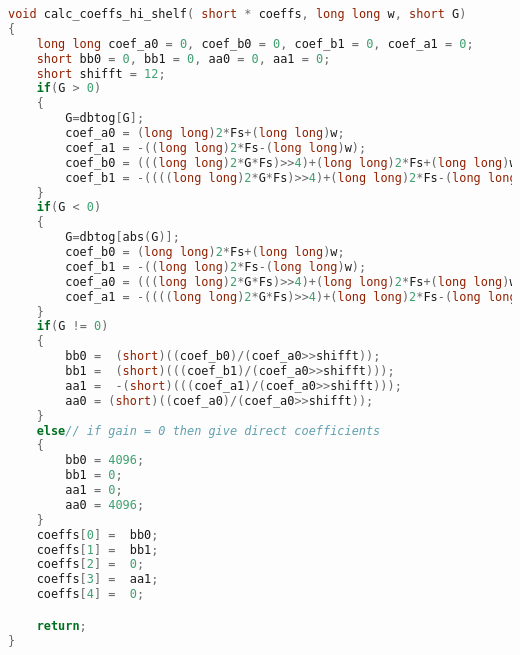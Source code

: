 \begin{lstlisting}[caption={Calculate high frequency shelving filter coefficients.},language=C,label={apcode:calc_hi_filt},tabsize=2]
void calc_coeffs_hi_shelf( short * coeffs, long long w, short G)
{
    long long coef_a0 = 0, coef_b0 = 0, coef_b1 = 0, coef_a1 = 0;
    short bb0 = 0, bb1 = 0, aa0 = 0, aa1 = 0;
    short shifft = 12;
    if(G > 0)
    {
        G=dbtog[G];
        coef_a0 = (long long)2*Fs+(long long)w;
        coef_a1 = -((long long)2*Fs-(long long)w);
        coef_b0 = (((long long)2*G*Fs)>>4)+(long long)2*Fs+(long long)w;
        coef_b1 = -((((long long)2*G*Fs)>>4)+(long long)2*Fs-(long long)w);
    }
    if(G < 0)
    {
        G=dbtog[abs(G)];
        coef_b0 = (long long)2*Fs+(long long)w;
        coef_b1 = -((long long)2*Fs-(long long)w);
        coef_a0 = (((long long)2*G*Fs)>>4)+(long long)2*Fs+(long long)w;
        coef_a1 = -((((long long)2*G*Fs)>>4)+(long long)2*Fs-(long long)w);
    }
    if(G != 0)
    {
        bb0 =  (short)((coef_b0)/(coef_a0>>shifft));
        bb1 =  (short)(((coef_b1)/(coef_a0>>shifft)));
        aa1 =  -(short)(((coef_a1)/(coef_a0>>shifft)));
        aa0 = (short)((coef_a0)/(coef_a0>>shifft));
    }
    else// if gain = 0 then give direct coefficients
    {
        bb0 = 4096;
        bb1 = 0;
        aa1 = 0;
        aa0 = 4096;
    }
    coeffs[0] =  bb0;
    coeffs[1] =  bb1;
    coeffs[2] =  0;
    coeffs[3] =  aa1;
    coeffs[4] =  0;

    return;
}
\end{lstlisting}
